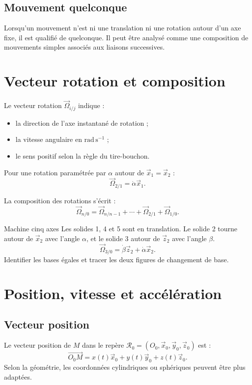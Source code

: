 \subsection{Mouvement quelconque}

Lorsqu'un mouvement n'est ni une translation ni une rotation autour d'un
axe fixe, il est qualifié de quelconque. Il peut être analysé comme une
composition de mouvements simples associés aux liaisons successives.

\section{Vecteur rotation et composition}
\label{sec:cine-rotation}

Le vecteur rotation $\vec\Omega_{i/j}$ indique :
\begin{itemize}
  \item la direction de l'axe instantané de rotation ;
  \item la vitesse angulaire en $\mathrm{rad\,s^{-1}}$ ;
  \item le sens positif selon la règle du tire-bouchon.
\end{itemize}

Pour une rotation paramétrée par $\alpha$ autour de $\vec x_1=\vec x_2$ :
\[
\vec\Omega_{2/1}=\dot\alpha\vec x_1.
\]

La composition des rotations s'écrit :
\[
\boxed{\vec\Omega_{n/0}
=\vec\Omega_{n/n-1}+\cdots+\vec\Omega_{2/1}+\vec\Omega_{1/0}.}
\]

\begin{TLCineApp}{Machine cinq axes}
Les solides 1, 4 et 5 sont en translation. Le solide 2 tourne autour de
$\vec x_2$ avec l'angle $\alpha$, et le solide 3 autour de $\vec z_2$
avec l'angle $\beta$.
\[
\vec\Omega_{3/0}
=\dot\beta\vec z_2+\dot\alpha\vec x_2.
\]
Identifier les bases égales et tracer les deux figures de changement de
base.
\end{TLCineApp}

\section{Position, vitesse et accélération}
\label{sec:cine-pva}

\subsection{Vecteur position}

Le vecteur position de $M$ dans le repère
$\mathcal R_0=(O_0,\vec x_0,\vec y_0,\vec z_0)$ est :
\[
\overrightarrow{O_0M}
=x(t)\vec x_0+y(t)\vec y_0+z(t)\vec z_0.
\]
Selon la géométrie, les coordonnées cylindriques ou sphériques peuvent
être plus adaptées.

